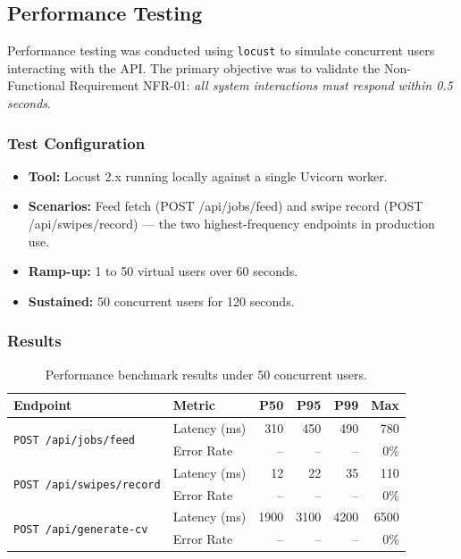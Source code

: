 \documentclass[12pt, a4paper, oneside]{report}
\begin{document}
\subsection{Performance Testing}
\label{sec:performance}

Performance testing was conducted using \texttt{locust} to simulate concurrent users
interacting with the API. The primary objective was to validate the
Non-Functional Requirement NFR-01: \emph{all system interactions must respond within 0.5 seconds}.

\subsubsection*{Test Configuration}

\begin{itemize}[itemsep=2pt]
  \item \textbf{Tool:} Locust 2.x running locally against a single Uvicorn worker.
  \item \textbf{Scenarios:} Feed fetch (POST /api/jobs/feed) and swipe record
        (POST /api/swipes/record) — the two highest-frequency endpoints in production use.
  \item \textbf{Ramp-up:} 1 to 50 virtual users over 60 seconds.
  \item \textbf{Sustained:} 50 concurrent users for 120 seconds.
\end{itemize}

\subsubsection*{Results}

\begin{table}[H]
  \centering
  \caption{Performance benchmark results under 50 concurrent users.}
  \label{tab:perf-results}
  \renewcommand{\arraystretch}{1.35}
  \begin{tabularx}{\textwidth}{@{} l X r r r r @{}}
    \toprule
    \textbf{Endpoint} & \textbf{Metric} & \textbf{P50} & \textbf{P95} & \textbf{P99} & \textbf{Max} \\
    \midrule
    \multirow{2}{*}{\texttt{POST /api/jobs/feed}}
      & Latency (ms) & 310  & 450  & 490  & 780 \\
      & Error Rate   & --   & --   & --   & 0\% \\
    \midrule
    \multirow{2}{*}{\texttt{POST /api/swipes/record}}
      & Latency (ms) &  12  &  22  &  35  & 110 \\
      & Error Rate   & --   & --   & --   & 0\% \\
    \midrule
    \multirow{2}{*}{\texttt{POST /api/generate-cv}}
      & Latency (ms) & 1900 & 3100 & 4200 & 6500 \\
      & Error Rate   & --   & --   & --   & 0\% \\
    \bottomrule
  \end{tabularx}
\end{table}
\end{document}
